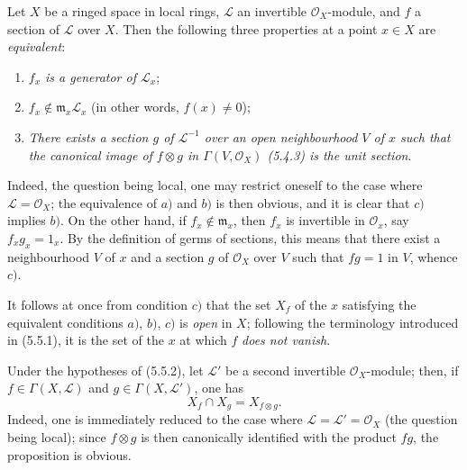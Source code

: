 \begin{env}[5.5.2]
\label{0.5.5.2}
Let $X$ be a ringed space in local rings, $\mathcal{L}$ an
invertible $\mathcal{O}_X$-module, and $f$ a section of $\mathcal{L}$ over
$X$. Then the following three properties at a point $x\in X$ are
\emph{equivalent}:
\begin{enumerate}
  \item[$a)$] \emph{$f_x$ is a generator of $\mathcal{L}_x$};
  \item[$b)$] \emph{$f_x\notin\mathfrak{m}_x\mathcal{L}_x$} (in other words,
    $f(x)\neq0$);
  \item[$c)$] \emph{There exists a section $g$ of $\mathcal{L}^{-1}$ over
    an open neighbourhood $V$ of $x$ such that the canonical image of $f\otimes
    g$ in $\Gamma(V,\mathcal{O}_X)$ (5.4.3) is the unit section}.
\end{enumerate}

Indeed, the question being local, one may restrict oneself to the case where
$\mathcal{L}=\mathcal{O}_X$; the equivalence of $a)$ and $b)$ is then
obvious, and it is clear that $c)$ implies $b)$. On the other hand, if
$f_x\notin\mathfrak{m}_x$, then $f_x$ is invertible in $\mathcal{O}_x$, say
$f_xg_x=1_x$. By the definition of germs of sections, this means that there
exist a neighbourhood $V$ of $x$ and a section $g$ of $\mathcal{O}_X$ over
$V$ such that $fg=1$ in $V$, whence $c)$.

It follows at once from condition $c)$ that the set $X_f$ of the $x$
satisfying the equivalent conditions $a)$, $b)$, $c)$ is \emph{open} in
$X$; following the terminology introduced in (5.5.1), it is the set of the
$x$ at which $f$ \emph{does not vanish}.
\end{env}

\begin{env}[5.5.3]
\label{0.5.5.3}
Under the hypotheses of (5.5.2), let $\mathcal{L}'$ be a second invertible
$\mathcal{O}_X$-module; then, if
$f\in\Gamma(X,\mathcal{L})$ and $g\in\Gamma(X,\mathcal{L}')$, one has
\[
  X_f\cap X_g=X_{f\otimes g}.
\]
Indeed, one is immediately reduced to the case where
$\mathcal{L}=\mathcal{L}'=\mathcal{O}_X$ (the question being local); since
$f\otimes g$ is then canonically identified with the product $fg$, the proposition
is obvious.
\end{env}



